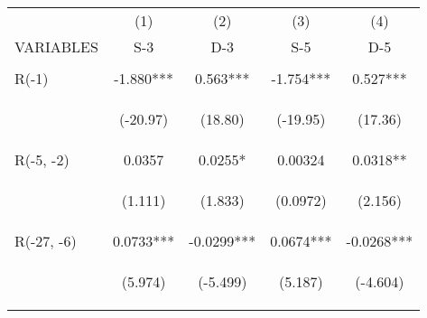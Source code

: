 \documentclass[]{article}
\begin{document}
\begin{center}
\begin{tabular}{lcccc} \hline
 & (1) & (2) & (3) & (4) \\
VARIABLES & S-3 & D-3 & S-5 & D-5 \\ \hline
\vspace{4pt} & \begin{footnotesize}\end{footnotesize} & \begin{footnotesize}\end{footnotesize} & \begin{footnotesize}\end{footnotesize} & \begin{footnotesize}\end{footnotesize} \\
R(-1) & -1.880*** & 0.563*** & -1.754*** & 0.527*** \\
\vspace{4pt} & \begin{footnotesize}(-20.97)\end{footnotesize} & \begin{footnotesize}(18.80)\end{footnotesize} & \begin{footnotesize}(-19.95)\end{footnotesize} & \begin{footnotesize}(17.36)\end{footnotesize} \\
R(-5, -2) & 0.0357 & 0.0255* & 0.00324 & 0.0318** \\
\vspace{4pt} & \begin{footnotesize}(1.111)\end{footnotesize} & \begin{footnotesize}(1.833)\end{footnotesize} & \begin{footnotesize}(0.0972)\end{footnotesize} & \begin{footnotesize}(2.156)\end{footnotesize} \\
R(-27, -6) & 0.0733*** & -0.0299*** & 0.0674*** & -0.0268*** \\
\vspace{4pt} & \begin{footnotesize}(5.974)\end{footnotesize} & \begin{footnotesize}(-5.499)\end{footnotesize} & \begin{footnotesize}(5.187)\end{footnotesize} & \begin{footnotesize}(-4.604)\end{footnotesize} \\

\end{tabular}
\end{center}
\end{document}
